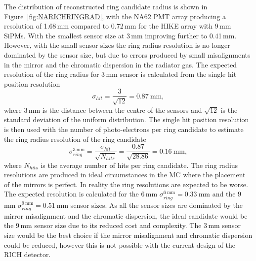 \documentclass[../../main.tex]{subfiles}
\begin{document}
    The distribution of reconstructed ring candidate radius is shown in Figure~\ref{fig:NARICHRINGRAD}, with the NA62 PMT array producing a resolution of 1.68\,mm compared to 0.72\,mm for the HIKE array with 9\,mm \glspl{SiPM}.
    With the smallest sensor size at 3\,mm improving further to 0.41\,mm. However, with the small sensor sizes the ring radius resolution is no longer dominated by the sensor size, but due to errors produced by small misalignments in the mirror and the chromatic dispersion in the radiator gas. 
    The expected resolution of the ring radius for 3\,mm sensor is calculated from the single hit position resolution
    \begin{equation}
        \sigma_{hit} = \frac{3}{\sqrt{12}} = \SI{0.87}{\milli\metre},
    \end{equation}
    where 3\,mm is the distance between the centre of the sensors and $\sqrt{12}$ is the standard deviation of the uniform distribution. The single hit position resolution is then used with the number of photo-electrons per ring candidate to estimate the ring radius resolution of the ring candidate
    \begin{equation}
        \sigma^{\SI{3}{\milli\metre}}_{ring} = \frac{\sigma_{hit}}{\sqrt{N_{hits}}} = \frac{0.87}{\sqrt{28.86}} = \SI{0.16}{\milli\metre},
    \end{equation}
    where $N_{hits}$ is the average number of hits per ring candidate.
    The ring radius resolutions are produced in ideal circumstances in the \gls{MC} where the placement of the mirrors is perfect. In reality the ring resolutions are expected to be worse. The expected resolution is calculated for the 6\,mm $\sigma^{\SI{6}{\milli\metre}}_{ring} = \SI{0.33}{\milli\metre}$ and the 9\,mm $\sigma^{\SI{9}{\milli\metre}}_{ring} = \SI{0.51}{\milli\metre}$ sensor sizes.
    As all the sensor sizes are dominated by the mirror misalignment and the chromatic dispersion, the ideal candidate would be the 9\,mm sensor size due to its reduced cost and complexity. The 3\,mm sensor size would be the best choice if the mirror misalignment and chromatic dispersion could be reduced, however this is not possible with the current design of the RICH detector.
\end{document}
